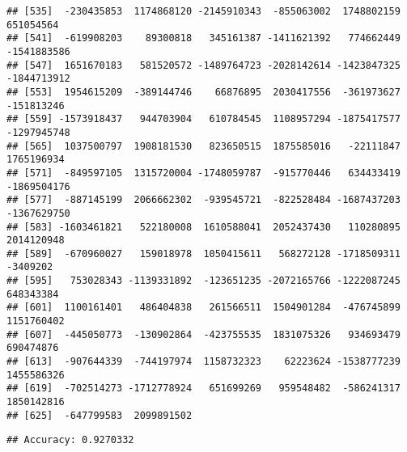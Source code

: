 \documentclass[
]{article}
\newenvironment{Shaded}{\begin{snugshade}}{\end{snugshade}}
\newcommand{\CommentTok}[1]{\textcolor[rgb]{0.56,0.35,0.01}{\textit{#1}}}
\newcommand{\DecValTok}[1]{\textcolor[rgb]{0.00,0.00,0.81}{#1}}
\newcommand{\FunctionTok}[1]{\textcolor[rgb]{0.13,0.29,0.53}{\textbf{#1}}}
\newcommand{\NormalTok}[1]{#1}
\newcommand{\OtherTok}[1]{\textcolor[rgb]{0.56,0.35,0.01}{#1}}
\newcommand{\SpecialCharTok}[1]{\textcolor[rgb]{0.81,0.36,0.00}{\textbf{#1}}}
\newcommand{\StringTok}[1]{\textcolor[rgb]{0.31,0.60,0.02}{#1}}
\begin{document}
\begin{verbatim}
## [535]  -230435853  1174868120 -2145910343  -855063002  1748802159   651054564
## [541]  -619908203    89300818   345161387 -1411621392   774662449 -1541883586
## [547]  1651670183   581520572 -1489764723 -2028142614 -1423847325 -1844713912
## [553]  1954615209  -389144746    66876895  2030417556  -361973627  -151813246
## [559] -1573918437   944703904   610784545  1108957294 -1875417577 -1297945748
## [565]  1037500797  1908181530   823650515  1875585016   -22111847  1765196934
## [571]  -849597105  1315720004 -1748059787  -915770446   634433419 -1869504176
## [577]  -887145199  2066662302  -939545721  -822528484 -1687437203 -1367629750
## [583] -1603461821   522180008  1610588041  2052437430   110280895  2014120948
## [589]  -670960027   159018978  1050415611   568272128 -1718509311    -3409202
## [595]   753028343 -1139331892  -123651235 -2072165766 -1222087245   648343384
## [601]  1100161401   486404838   261566511  1504901284  -476745899  1151760402
## [607]  -445050773  -130902864  -423755535  1831075326   934693479   690474876
## [613]  -907644339  -744197974  1158732323    62223624 -1538777239  1455586326
## [619]  -702514273 -1712778924   651699269   959548482  -586241317  1850142816
## [625]  -647799583  2099891502
\end{verbatim}

\begin{Shaded}
\end{Shaded}

\begin{verbatim}
## Accuracy: 0.9270332
\end{verbatim}
\end{document}
